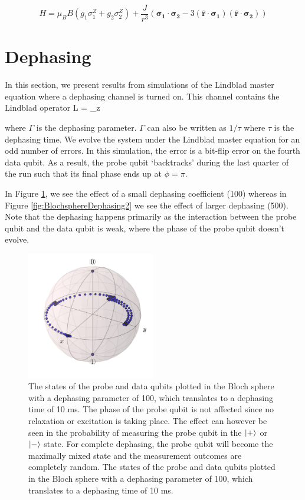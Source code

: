 \begin{equation}
H = \mu_B B( g_1 \sigma_1^Z + g_2 \sigma_2^Z) + \frac{J}{r^3} ( \mathbf{\sigma_1} \cdot \mathbf{\sigma_2} - 3 ( \hat{\mathbf{r}} \cdot \mathbf{\sigma_1}) ( \hat{\mathbf{r}}\cdot \mathbf{\sigma_2}))
\end{equation}




\section{Dephasing}
In this section, we present results from simulations of the Lindblad master equation where a dephasing channel is turned on. This channel contains the Lindblad operator
\beq
L  = \sqrt{\Gamma} \sigma_z
\eeq

where $\Gamma$ is the dephasing parameter. $\Gamma$ can also be written as $1/\tau$ where $\tau$ is the dephasing time. We evolve the system under the Lindblad master equation for an odd number of errors. In this simulation, the error is a bit-flip error on the fourth data qubit.  As a result, the probe qubit `backtracks'  during the last quarter of the run such that its final phase ends up at $\phi = \pi$. 

In Figure \ref{fig:BlochsphereDephasing}, we see the effect of a small dephasing coefficient (100) whereas in Figure \ref{fig:BlochsphereDephasing2} we see the effect of larger dephasing (500). Note that the dephasing happens primarily as the interaction between the probe qubit and the data qubit is weak, where the phase of the probe qubit doesn't evolve. 



\begin{figure}[h]
  \centering
    \includegraphics[width=0.5\textwidth]{Figures/Circ_orbit_odd_100_dephasing.png}
      \caption{The states of the probe and data qubits plotted in the Bloch sphere with a dephasing parameter of 100, which translates to a dephasing time of 10 ms. The phase of the probe qubit is not affected since no relaxation or excitation is taking place. The effect can however be seen in the probability of measuring the probe qubit in the $\ket{+}$ or $\ket{-}$ state. For complete dephasing, the probe qubit will become the maximally mixed state and the measurement outcomes are completely random. The states of the probe and data qubits plotted in the Bloch sphere with a dephasing parameter of 100, which translates to a dephasing time of 10 ms.}
      \label{fig:BlochsphereDephasing}
      
\end{figure}




